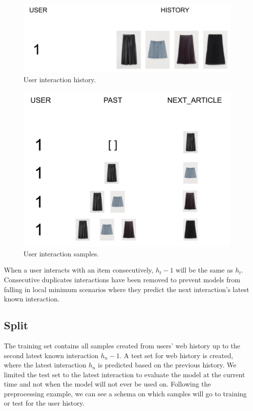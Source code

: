 \documentclass{tex_files/kththesis}
\begin{document}
\begin{figure}[H]
    \centering
    \includegraphics[scale=0.3]{images/dataset/dataset.png}
    \caption{User interaction history.}
\end{figure}

\begin{figure}[H]
    \centering
    \includegraphics[scale=0.45]{images/dataset/predictionsdataset.png}
    \caption{User interaction samples.}
\end{figure}

When a user interacts with an item consecutively, $h_t-1$ will be the same as $h_t$. Consecutive duplicates interactions have been removed to prevent models from falling in local minimum scenarios where they predict the next interaction's latest known interaction.

\subsection{Split}
The training set contains all samples created from users' web history up to the second latest known interaction $h_n-1$. A test set for web history is created, where the latest interaction $h_n$ is predicted based on the previous history. We limited the test set to the latest interaction to evaluate the model at the current time and not when the model will not ever be used on. Following the preprocessing example, we can see a schema on which samples will go to training or test for the user history.
\end{document}
